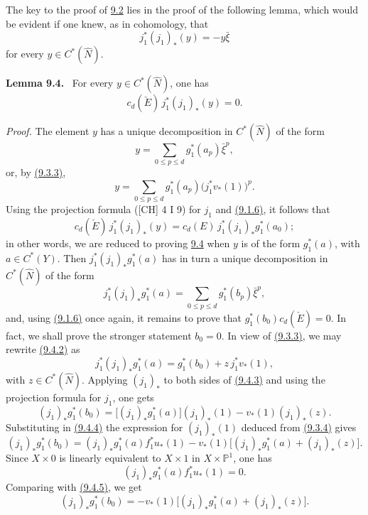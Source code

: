 \documentclass[11pt]{article}
\newenvironment{statement}[1]{\par\medskip\noindent\textbf{#1.}\ }{\par\medskip}
\begin{document}
The key to the proof of \hyperref[sga5:VII:theorem:9.2]{9.2} lies in the proof of the following lemma, which would be evident if one knew, as in cohomology, that
\[
j_1^*(j_1)_*(y)=-y\bar\xi
\]
for every $y\in C^*(\widehat N)$.

\label{sga5:VII:lemma:9.4}\begin{statement}{Lemma 9.4}
For every $y\in C^*(\widehat N)$, one has
\[
c_d(\check E)\,j_1^*(j_1)_*(y)=0.
\]
\end{statement}

\emph{Proof.} The element $y$ has a unique decomposition in $C^*(\widehat N)$ of the form
\[
y=\sum_{0\le p\le d}g_1^*(a_p)\bar\xi^p,
\]
or, by \hyperref[sga5:VII:equation:9.3.3]{(9.3.3)},
\[
y=\sum_{0\le p\le d}g_1^*(a_p)\bigl(j_1^*v_*(1)\bigr)^p.
\tag{9.4.1}\label{sga5:VII:equation:9.4.1}
\]
Using the projection formula ([CH] 4 I 9) for $j_1$ and \hyperref[sga5:VII:equation:9.1.6]{(9.1.6)}, it follows that
\[
c_d(\check E)\,j_1^*(j_1)_*(y)=c_d(E)\,j_1^*(j_1)_*g_1^*(a_0);
\]
in other words, we are reduced to proving \hyperref[sga5:VII:lemma:9.4]{9.4} when $y$ is of the form $g_1^*(a)$, with $a\in C^*(Y)$. Then $j_1^*(j_1)_*g_1^*(a)$ has in turn a unique decomposition in $C^*(\widehat N)$ of the form
\[
j_1^*(j_1)_*g_1^*(a)=\sum_{0\le p\le d}g_1^*(b_p)\bar\xi^p,
\tag{9.4.2}\label{sga5:VII:equation:9.4.2}
\]
and, using \hyperref[sga5:VII:equation:9.1.6]{(9.1.6)} once again, it remains to prove that $g_1^*(b_0)c_d(\check E)=0$. In fact, we shall prove the stronger statement $b_0=0$. In view of \hyperref[sga5:VII:equation:9.3.3]{(9.3.3)}, we may rewrite \hyperref[sga5:VII:equation:9.4.2]{(9.4.2)} as
\[
j_1^*(j_1)_*g_1^*(a)=g_1^*(b_0)+z\,j_1^*v_*(1),
\tag{9.4.3}\label{sga5:VII:equation:9.4.3}
\]
with $z\in C^*(\widehat N)$. Applying $(j_1)_*$ to both sides of \hyperref[sga5:VII:equation:9.4.3]{(9.4.3)} and using the projection formula for $j_1$, one gets
\[
(j_1)_*g_1^*(b_0)=\bigl[(j_1)_*g_1^*(a)\bigr](j_1)_*(1)-v_*(1)(j_1)_*(z).
\tag{9.4.4}\label{sga5:VII:equation:9.4.4}
\]
Substituting in \hyperref[sga5:VII:equation:9.4.4]{(9.4.4)} the expression for $(j_1)_*(1)$ deduced from \hyperref[sga5:VII:equation:9.3.4]{(9.3.4)} gives
\[
(j_1)_*g_1^*(b_0)=
(j_1)_*g_1^*(a)f_1^*u_*(1)-v_*(1)\bigl[(j_1)_*g_1^*(a)+(j_1)_*(z)\bigr].
\tag{9.4.5}\label{sga5:VII:equation:9.4.5}
\]
Since $X\times0$ is linearly equivalent to $X\times1$ in $X\times\mathbb P^1$, one has
\[
(j_1)_*g_1^*(a)f_1^*u_*(1)=0.
\tag{9.4.6}\label{sga5:VII:equation:9.4.6}
\]
Comparing with \hyperref[sga5:VII:equation:9.4.5]{(9.4.5)}, we get
\[
(j_1)_*g_1^*(b_0)=-v_*(1)\bigl[(j_1)_*g_1^*(a)+(j_1)_*(z)\bigr].
\tag{9.4.7}\label{sga5:VII:equation:9.4.7}
\]
\end{document}
